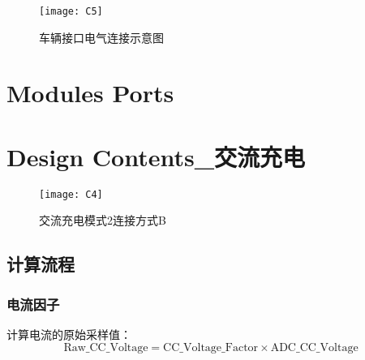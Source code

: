 \begin{figure}[!htbp]
    \centering
    \texttt{[image: C5]}
    \caption{车辆接口电气连接示意图}
    \label{fig:C5}
\end{figure}

\section{Modules Ports}


\section{Design Contents\_交流充电}








\begin{figure}[!htbp]
    \centering
    \texttt{[image: C4]}
    \caption{交流充电模式2连接方式B\cite{GB18487_1}}
    \label{fig:C4}
\end{figure}



\subsection{计算流程}
\subsubsection*{电流因子}
        计算电流的原始采样值：
            \begin{equation}
                \mathrm{Raw\_CC\_Voltage} = \mathrm{CC\_Voltage\_Factor} \times  \mathrm{ADC\_CC\_Voltage}
                \label{eq:CC1}
            \end{equation}

